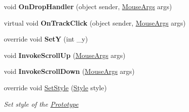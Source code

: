 \begin{DoxyCompactItemize}
\mbox{\label{class_space_v_i_l_1_1_vertical_slider_a0a1be6c99a399f08071c642664616850}} 
void {\bfseries On\+Drop\+Handler} (object sender, \mbox{\hyperlink{class_space_v_i_l_1_1_core_1_1_mouse_args}{Mouse\+Args}} args)
\item 
\mbox{\label{class_space_v_i_l_1_1_vertical_slider_a3fdb455b5b3aa9a3d5c0c76cafc9a850}} 
virtual void {\bfseries On\+Track\+Click} (object sender, \mbox{\hyperlink{class_space_v_i_l_1_1_core_1_1_mouse_args}{Mouse\+Args}} args)
\item 
\mbox{\label{class_space_v_i_l_1_1_vertical_slider_aae371b8cd0f9fcd13e82b3ea802b93d4}} 
override void {\bfseries SetY} (int \+\_\+y)
\item 
\mbox{\label{class_space_v_i_l_1_1_vertical_slider_a74de9febfc62fbafb8d1da1f9edbcaf6}} 
void {\bfseries Invoke\+Scroll\+Up} (\mbox{\hyperlink{class_space_v_i_l_1_1_core_1_1_mouse_args}{Mouse\+Args}} args)
\item 
\mbox{\label{class_space_v_i_l_1_1_vertical_slider_a1c7d604fc76c807f450d4e8f712ce2ff}} 
void {\bfseries Invoke\+Scroll\+Down} (\mbox{\hyperlink{class_space_v_i_l_1_1_core_1_1_mouse_args}{Mouse\+Args}} args)
\item 
override void \mbox{\hyperlink{class_space_v_i_l_1_1_vertical_slider_af6e1f3b91c48cecf0bd791c787d3fe0d}{Set\+Style}} (\mbox{\hyperlink{class_space_v_i_l_1_1_decorations_1_1_style}{Style}} style)
\begin{DoxyCompactList}\small\item\em Set style of the \mbox{\hyperlink{class_space_v_i_l_1_1_prototype}{Prototype}} \end{DoxyCompactList}\end{DoxyCompactItemize}
